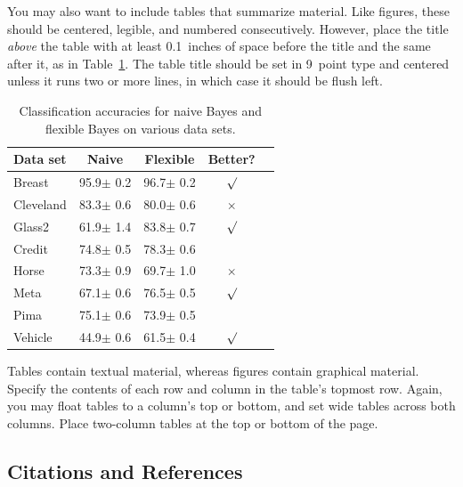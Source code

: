 \documentclass{article}
\begin{document}
You may also want to include tables that summarize material. Like
figures, these should be centered, legible, and numbered consecutively.
However, place the title \emph{above} the table with at least
0.1~inches of space before the title and the same after it, as in
Table~\ref{sample-table}. The table title should be set in 9~point
type and centered unless it runs two or more lines, in which case it
should be flush left.


\begin{table}[t]
\caption{Classification accuracies for naive Bayes and flexible
Bayes on various data sets.}
\label{sample-table}
\vskip 0.15in
\begin{center}
\begin{small}
\begin{sc}
\begin{tabular}{lcccr}
\toprule
Data set & Naive & Flexible & Better? \\
\midrule
Breast    & 95.9$\pm$ 0.2& 96.7$\pm$ 0.2& $\surd$ \\
Cleveland & 83.3$\pm$ 0.6& 80.0$\pm$ 0.6& $\times$\\
Glass2    & 61.9$\pm$ 1.4& 83.8$\pm$ 0.7& $\surd$ \\
Credit    & 74.8$\pm$ 0.5& 78.3$\pm$ 0.6&         \\
Horse     & 73.3$\pm$ 0.9& 69.7$\pm$ 1.0& $\times$\\
Meta      & 67.1$\pm$ 0.6& 76.5$\pm$ 0.5& $\surd$ \\
Pima      & 75.1$\pm$ 0.6& 73.9$\pm$ 0.5&         \\
Vehicle   & 44.9$\pm$ 0.6& 61.5$\pm$ 0.4& $\surd$ \\
\bottomrule
\end{tabular}
\end{sc}
\end{small}
\end{center}
\vskip -0.1in
\end{table}

Tables contain textual material, whereas figures contain graphical material.
Specify the contents of each row and column in the table's topmost
row. Again, you may float tables to a column's top or bottom, and set
wide tables across both columns. Place two-column tables at the
top or bottom of the page.

\subsection{Citations and References}
\end{document}
